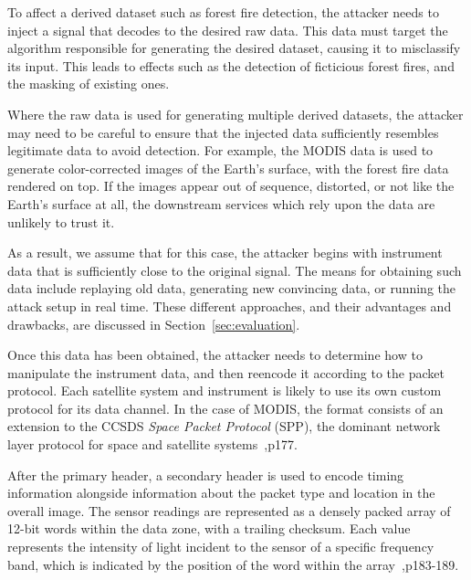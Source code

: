 To affect a derived dataset such as forest fire detection, the attacker needs to inject a signal that decodes to the desired raw data.
This data must target the algorithm responsible for generating the desired dataset, causing it to misclassify its input.
This leads to effects such as the detection of ficticious forest fires, and the masking of existing ones. %

Where the raw data is used for generating multiple derived datasets, the attacker may need to be careful to ensure that the injected data sufficiently resembles legitimate data to avoid detection. %
For example, the MODIS data is used to generate color-corrected images of the Earth's surface, with the forest fire data rendered on top.
If the images appear out of sequence, distorted, or not like the Earth's surface at all, the downstream services which rely upon the data are unlikely to trust it.

As a result, we assume that for this case, the attacker begins with instrument data that is sufficiently close to the original signal.
The means for obtaining such data include replaying old data, generating new convincing data, or running the attack setup in real time.
These different approaches, and their advantages and drawbacks, are discussed in Section~\ref{sec:evaluation}.



Once this data has been obtained, the attacker needs to determine how to manipulate the instrument data, and then reencode it according to the packet protocol.
Each satellite system and instrument is likely to use its own custom protocol for its data channel.
In the case of MODIS, the format consists of an extension to the CCSDS \textit{Space Packet Protocol} (SPP), the dominant network layer protocol for space and satellite systems~\cite{modisDescription},p177.

After the primary header, a secondary header is used to encode timing information alongside information about the packet type and location in the overall image.
The sensor readings are represented as a densely packed array of 12-bit words within the data zone, with a trailing checksum.
Each value represents the intensity of light incident to the sensor of a specific frequency band, which is indicated by the position of the word within the array~\cite{modisDescription},p183-189.


